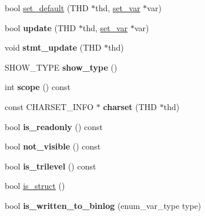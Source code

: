 \begin{DoxyCompactItemize}
\item 
bool \mbox{\hyperlink{classsys__var_aa6156d101adc98441ce701a2da290987}{set\+\_\+default}} (T\+HD $\ast$thd, \mbox{\hyperlink{classset__var}{set\+\_\+var}} $\ast$var)
\item 
\mbox{\label{classsys__var_ac30f3b2a139ba1a0bf996fee19c93622}} 
bool {\bfseries update} (T\+HD $\ast$thd, \mbox{\hyperlink{classset__var}{set\+\_\+var}} $\ast$var)
\item 
\mbox{\label{classsys__var_ae670f9612f1f5bdf6cecfeee1eb024fa}} 
void {\bfseries stmt\+\_\+update} (T\+HD $\ast$thd)
\item 
\mbox{\label{classsys__var_a83ee3933708da1f2ca103279627f524d}} 
S\+H\+O\+W\+\_\+\+T\+Y\+PE {\bfseries show\+\_\+type} ()
\item 
\mbox{\label{classsys__var_ab1d3a1bbc648ff1641f7a1a5fa3a62b1}} 
int {\bfseries scope} () const
\item 
\mbox{\label{classsys__var_a995f827ab4ea2c9468f2e008234c2205}} 
const C\+H\+A\+R\+S\+E\+T\+\_\+\+I\+N\+FO $\ast$ {\bfseries charset} (T\+HD $\ast$thd)
\item 
\mbox{\label{classsys__var_af5aaf54aa2d6bc4c64c99d9cdaa43bc1}} 
bool {\bfseries is\+\_\+readonly} () const
\item 
\mbox{\label{classsys__var_ad6ee33a8400faf0d0766d18c9424aad0}} 
bool {\bfseries not\+\_\+visible} () const
\item 
\mbox{\label{classsys__var_aa717ca128e90dd8af2d801fd82b3ef3b}} 
bool {\bfseries is\+\_\+trilevel} () const
\item 
bool \mbox{\hyperlink{classsys__var_a9c49fcf3475337b962837782f5dbb9e6}{is\+\_\+struct}} ()
\item 
\mbox{\label{classsys__var_ac666b35acc5b09b224edee5e0e64417c}} 
bool {\bfseries is\+\_\+written\+\_\+to\+\_\+binlog} (enum\+\_\+var\+\_\+type type)
\item 
\mbox{\label{classsys__var_a4a792e19f28bd16bb6b0b12d3687b31e}} 

\end{DoxyCompactItemize}
